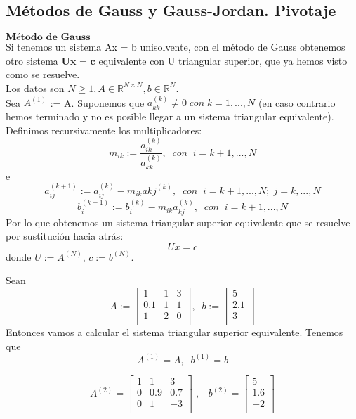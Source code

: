 \subsection{Métodos de Gauss y Gauss-Jordan. Pivotaje}
\begin{nlist}
\item $\textbf{Método de Gauss}$\\
Si tenemos un sistema Ax = b unisolvente, con el método de Gauss obtenemos otro sistema $\textbf{Ux = c}$ equivalente con U triangular superior, que ya hemos visto como se resuelve.\\
Los datos son $N \geq 1, A \in \mathbb{R}^{N \times N}, b \in \mathbb{R}^N$.\\
Sea $A^{(1)}$ := A. Suponemos que $a_{kk}^{(k)} \neq 0 \; con \; k = 1,...,N$ (en caso contrario hemos terminado y no es posible llegar a un sistema triangular equivalente). Definimos recursivamente los multiplicadores:
\[ m_{ik} := \frac{a_{ik}^{(k)}}{a_{kk}^{(k)}}, \; \; con \; \; i = k+1,...,N \]
e
\[ a_{ij}^{(k+1)} := a_{ij}^{(k)} - m_{ik}a{kj}^{(k)}, \; \; con \; \; i = k+1,...,N; \; j = k,...,N \]
\[ b_i^{(k+1)} := b_i^{(k)} - m_{ik}a_{kj}^{(k)}, \; \; con \; \; i = k+1,...,N \]
Por lo que obtenemos un sistema triangular superior equivalente que se resuelve por sustitución hacia atrás:
\[ Ux = c \]
donde $U := A^{(N)}$, $c := b^{(N)}$.
	\begin{ejemplo}
	Sean
	\[ A :=
	\begin{bmatrix}
	1 & 1 & 3 \\
	0.1 & 1 & 1 \\
	1 & 2 & 0 \\
	\end{bmatrix}, \; \;
	b :=
	\begin{bmatrix}
	5 \\
	2.1 \\
	3 \\
	\end{bmatrix} \]
	Entonces vamos a calcular el sistema triangular superior equivalente.
	Tenemos que
	\[ A^{(1)} = A, \; \; b^{(1)} = b \]

	\[ A^{(2)} =
	\begin{bmatrix}
	1 & 1 & 3 \\
	0 & 0.9 & 0.7 \\
	0 & 1 & -3 \\
	\end{bmatrix} \; ,
	\; \; \;
	b^{(2)} =
	\begin{bmatrix}
	5 \\
	1.6 \\
	-2 \\
	\end{bmatrix} \]


\end{ejemplo}
\end{nlist}
